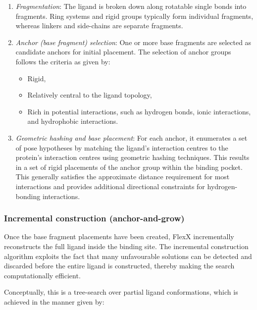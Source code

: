 \documentclass[12pt]{article}
\begin{document}
\begin{enumerate}

  \item \emph{Fragmentation}: The ligand is broken down along rotatable single bonds into fragments. Ring systems and rigid groups typically form individual fragments, whereas linkers and side-chains are separate fragments.

  \item \emph{Anchor (base fragment) selection}: One or more base fragments are selected as candidate anchors for initial placement. The selection of anchor groups follows the criteria as given by:
        \begin{itemize}
          \item Rigid,
          \item Relatively central to the ligand topology,
          \item Rich in potential interactions, such as hydrogen bonds, ionic interactions, and hydrophobic interactions.
        \end{itemize}

  \item \emph{Geometric hashing and base placement}: For each anchor, it enumerates a set of pose hypotheses by matching the ligand's interaction centres to the protein's interaction centres using geometric hashing techniques\cite{CH7_rarey1996}. This results in a set of rigid placements of the anchor group within the binding pocket. This generally satisfies the approximate distance requirement for most interactions and provides additional directional constraints for hydrogen-bonding interactions.
\end{enumerate}

\subsubsection{Incremental construction (anchor-and-grow)}
Once the base fragment placements have been created, FlexX incrementally reconstructs the full ligand inside the binding site. The incremental construction algorithm exploits the fact that many unfavourable solutions can be detected and discarded before the entire ligand is constructed, thereby making the search computationally efficient.

Conceptually, this is a tree-search over partial ligand conformations, which is achieved in the manner given by:
\end{document}
